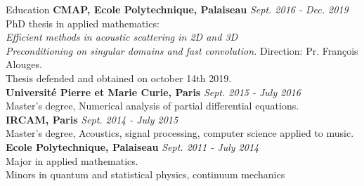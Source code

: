 \documentclass{resume} %
\begin{document}

\begin{rSection}{Education}
{\bf CMAP, Ecole Polytechnique, Palaiseau} \hfill {\em Sept. 2016 - Dec. 2019} 
\\ PhD thesis in applied mathematics:\\
{\em Efficient methods in acoustic scattering in 2D and 3D\\
Preconditioning on singular domains and fast convolution.} \hfill Direction: Pr. François Alouges. \\
Thesis defended and obtained on october 14th 2019.\\ 
{\bf Université Pierre et Marie Curie, Paris} \hfill {\em Sept. 2015 - July 2016} 
\\ Master's degree, Numerical analysis of partial differential equations.\\
{\bf IRCAM, Paris} \hfill {\em Sept. 2014 - July 2015} 
\\ Master's degree, Acoustics, signal processing, computer science applied to music. \\
{\bf Ecole Polytechnique, Palaiseau} \hfill {\em Sept. 2011 - July 2014}\\
Major in applied mathematics. \\
Minors in quantum and statistical physics, continuum mechanics



\end{rSection}
\end{document}
